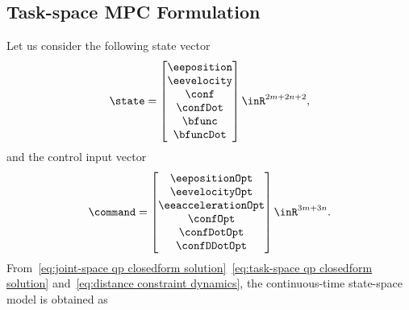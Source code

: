 \subsection{Task-space MPC Formulation}
Let us consider the following state vector
\begin{equation}\label{eq:state}
	\state = \begin{bmatrix}
		\eeposition \\ \eevelocity \\ \conf \\ \confDot \\ \bfunc \\ \bfuncDot
	\end{bmatrix}\inR^{2m+2n+2},
\end{equation}
and the control input vector
\begin{equation}
	\command = \begin{bmatrix}
		\eepositionOpt \\ \eevelocityOpt \\ \eeaccelerationOpt \\  \confOpt \\ \confDotOpt \\ \confDDotOpt
	\end{bmatrix}\inR^{3m+3n}.
\end{equation}
From~\cref{eq:joint-space qp closedform solution}~\cref{eq:task-space qp closedform solution} and~\cref{eq:distance constraint dynamics}, the continuous-time state-space model is obtained as 
